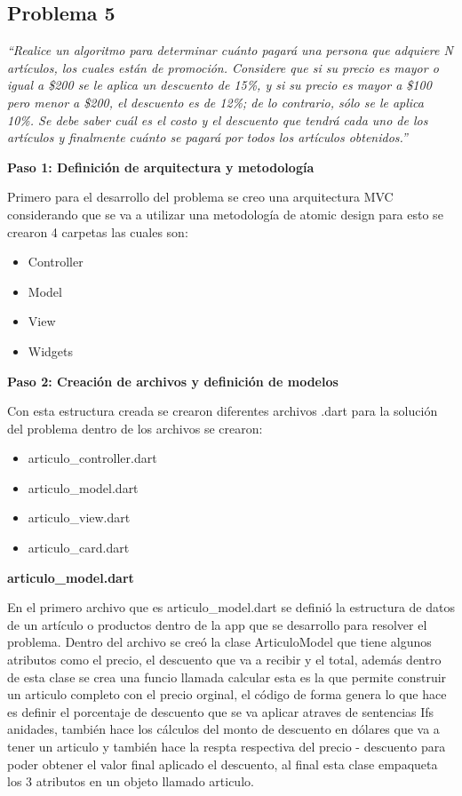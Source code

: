 \subsection{Problema 5}

\textit {“Realice un algoritmo para determinar cuánto pagará una persona que adquiere N artículos, los cuales están de promoción. Considere que si su precio es mayor o igual a \$200 se le aplica un descuento de 15\%, y si su precio es mayor a \$100 pero menor a \$200, el descuento es de 12\%; de lo contrario, sólo se le aplica 10\%. Se debe saber cuál es el costo y el descuento que tendrá cada uno de los artículos y finalmente cuánto se pagará por todos los artículos obtenidos.”}

\textbf{Paso 1: Definición de arquitectura y metodología}

Primero para el desarrollo del problema se creo una arquitectura MVC considerando que se va a utilizar una metodología de atomic design para esto se crearon 4 carpetas las cuales son:
\begin{itemize}
    \item Controller
    \item Model
    \item View
    \item Widgets
\end{itemize}

\textbf{Paso 2: Creación de archivos y definición de modelos}

Con esta estructura creada se crearon diferentes archivos .dart para la solución del problema dentro de los archivos se crearon: 
\begin{itemize}
    \item articulo\_controller.dart
    \item articulo\_model.dart
    \item articulo\_view.dart
    \item articulo\_card.dart
\end{itemize}

\textbf{articulo\_model.dart}

En el primero archivo que es articulo\_model.dart se definió la estructura de datos de un artículo o productos dentro de la app que se desarrollo para resolver el problema. Dentro del archivo se creó la clase ArticuloModel que tiene algunos atributos como el precio, el descuento que va a recibir y el total, además dentro de esta clase se crea una funcio llamada calcular esta es la que permite construir un articulo completo con el precio orginal, el código de forma genera lo que hace es definir el porcentaje de descuento que se va aplicar atraves de sentencias Ifs anidades, también hace los cálculos del monto de descuento en dólares que va a tener un articulo y también hace la respta respectiva del precio  - descuento para poder obtener el valor final aplicado el descuento, al final esta clase empaqueta los 3 atributos en un objeto llamado articulo.


